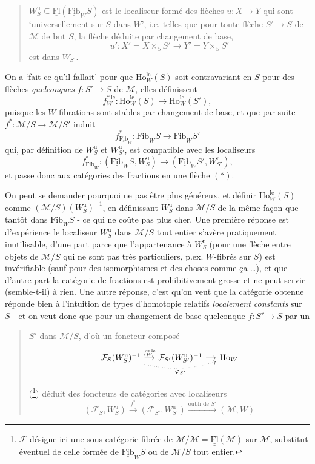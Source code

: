 \documentclass[11pt]{article}
\newcommand{\printedpage}[1]{{\reversemarginpar\marginnote{\raggedleft\scriptsize ed.~#1}}}
\newcommand{\msp}[1]{\marginpar{\raggedright\scriptsize ms.~#1}}
\newcommand{\Fib}{\underline{\mathrm{Fib}}}
\newcommand{\Fl}{\underline{\mathrm{Fl}}}
\newcommand{\cM}{\mathcal{M}}
\newcommand{\cF}{\mathcal{F}}
\newcommand{\Ho}{\mathrm{Ho}}
\newcommand{\Wu}{W^{\mathrm{u}}}
\newcommand{\lc}{\mathrm{lc}}
\begin{document}
\begin{quote}
$\Wu_S \subseteq \Fl(\Fib_W S)$ est le localiseur formé des flèches $u : X \longrightarrow Y$ qui sont ‘universellement sur $S$ dans $W$’, i.e. telles que pour toute flèche $S' \longrightarrow S$ de $\cM$ de but $S$, la flèche déduite par changement de base,
\[
u' : X' = X \times_S S' \longrightarrow Y' = Y \times_S S'
\]
est dans $W_{S'}$.
\end{quote}

On a ‘fait ce qu'il fallait’ pour que $\Ho^{\lc}_W(S)$ soit contravariant en $S$ pour des flèches \textit{quelconques} $f : S' \longrightarrow S$ de $\cM$, elles définissent
\[
f^{*\,\lc}_W : \Ho^{\lc}_W(S) \longrightarrow \Ho^{\lc}_W(S'), \tag*{$(**)$}
\]
\msp{page 211}
puisque les $W$-fibrations sont stables par changement de base, et que par suite $f^* : \cM/S \longrightarrow \cM/S'$ induit
\[
f^*_{\Fib_W} : \Fib_W S \longrightarrow \Fib_W S'
\]
qui, par définition de $\Wu_S$ et $\Wu_{S'}$, est compatible avec les localiseurs
\[
f^*_{\Fib_W} : (\Fib_W S, \Wu_S) \longrightarrow (\Fib_W S', \Wu_{S'}),
\]
et passe donc aux catégories des fractions en une flèche $(*)$.

On peut se demander pourquoi ne pas être plus généreux, et définir $\Ho^{\lc}_W(S)$ comme $(\cM/S)(\Wu_S)^{-1}$, en définissant $\Wu_S$ dans $\cM/S$ de la même façon que tantôt dans $\Fib_W S$ - ce qui ne coûte pas plus cher. Une première réponse est d'expérience le localiseur $\Wu_S$ dans $\cM/S$ tout entier s'avère pratiquement inutilisable, d'une part parce que l'appartenance à $\Wu_S$ (pour une flèche entre objets de $\cM/S$ qui ne sont pas très particuliers, p.ex. $W$-fibrés sur $S$) est invérifiable (sauf pour des isomorphismes et des choses comme ça \dots), et que d'autre part la catégorie de fractions est prohibitivement
\printedpage{137}
\msp{page 212}
grosse et ne peut servir (semble-t-il) à rien. Une autre réponse, c'est qu'on veut que la catégorie obtenue réponde bien à l'intuition de types d'homotopie relatifs \textit{localement constants} sur $S$ - et on veut donc que pour un changement de base quelconque $f : S' \longrightarrow S$ par un

\begin{quote}
$S'$ dans $\cM/S$, d'où un foncteur composé
\[
\begin{tikzcd}[column sep=small]
\cF_S(\Wu_S)^{-1} \arrow[r, "f^{*\,\lc}_W"] \arrow[rr, dotted, bend right=15, "\varphi_{S'}"'] & \cF_{S'}(\Wu_{S'})^{-1} \arrow[r] & \Ho_W
\end{tikzcd}
\]

(\footnote[121]{$\cF$ désigne ici une sous-catégorie fibrée de $\cM/\cM = \underline{\Fl}(\cM)$ sur $\cM$, substitut éventuel de celle formée de $\Fib_W S$ ou de $\cM/S$ tout entier.}) déduit des foncteurs de catégories avec localiseurs
\[
(\cF_S, \Wu_S) \xrightarrow{f^*} (\cF_{S'}, \Wu_{S'}) \xrightarrow{\text{oubli de } S'} (\cM, W)
\]
\end{quote}
\end{document}

